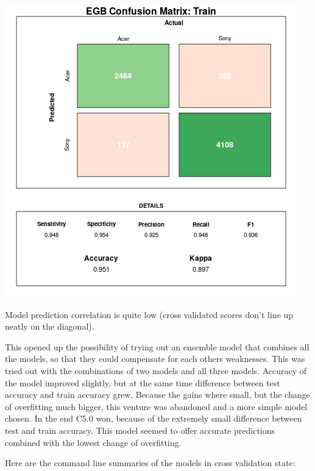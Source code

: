 \documentclass[12pt,a4paper,leqno]{report}
\theoremstyle{plain}
\theoremstyle{definition}
\theoremstyle{remark}
\begin{document}
\bigskip
{
    \centering
    \includegraphics[width=\textwidth,height=\textheight,keepaspectratio]{cm_egb_train.png}
    \par
}
\bigskip

Model prediction correlation is quite low (cross validated scores don't line up neatly on the diagonal).


This opened up the possibility of trying out an ensemble model that combines all the models, so that
they could compensate for each others weaknesses. This was tried out with the combinations of two models and all
three models. Accuracy of the model improved slightly, but at the same time difference between test accuracy and train
accuracy grew. Because the gains where small, but the change of overfitting much bigger, this venture was abandoned and
a more simple model chosen. In the end C5.0 won, because of the extremely small difference between test and train accuracy.
This model seemed to offer accurate predictions combined with the lowest change of overfitting.

Here are the command line summaries of the models in cross validation state:




\end{document}
